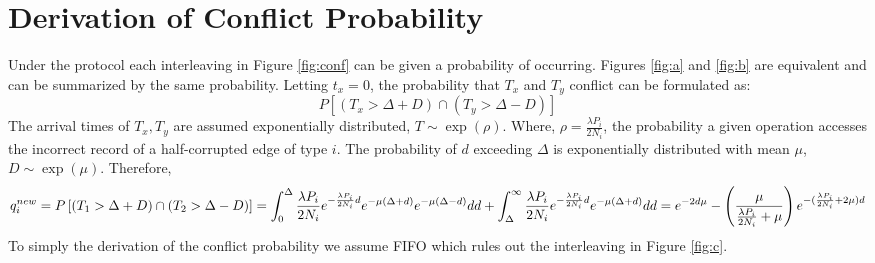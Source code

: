 \section{Derivation of Conflict Probability}
\label{sec:deriv-confl-prob}

Under the \tDelta protocol each interleaving in Figure \ref{fig:conf} can be given a probability of occurring. Figures \ref{fig:a} and \ref{fig:b} are equivalent and can be summarized by the same probability. Letting $t_x = 0$, the probability that $T_x$ and $T_y$ conflict can be formulated as: $$ P \left[ ( T_x >  \Delta + D) \cap (T_y > \Delta-D) \right]$$ The arrival times of $T_x,T_y$ are assumed exponentially distributed, $T \sim \exp (\rho)$.
Where, $ \rho  = \frac{\lambda P_i}{2N_i}$, the probability a given operation accesses the incorrect record of a half-corrupted edge of type $i$.
The probability of $d$ exceeding $\Delta$ is exponentially distributed with mean $\mu$, $D\sim \exp(\mu)$.
Therefore,
\begin{dmath*}
   q^{new}_{i} =  {P \left[ ( T_1 >  \Delta + D) \cap (T_2 > \Delta-D)  \right]} \\
   =  \int_{0}^{\Delta}  \frac{\lambda P_i}{2 N_i} e^{-\frac{\lambda P_i}{2 N_i} d} e^{-\mu (\Delta+d)} e^{-\mu (\Delta-d)} dd + \int_{\Delta}^{\infty} \frac{\lambda P_i}{2 N_i} e^{-\frac{\lambda P_i}{2 N_i} d} e^{-\mu (\Delta+d)} dd  \\
   =  e^{-2 d \mu} - \left( \frac{\mu}{\frac{\lambda P_i}{2 N_i} + \mu} \right) e^{-(\frac{\lambda P_i}{2 N_i}+ 2\mu)d} \\
 \end{dmath*}
To simply the derivation of the conflict probability we assume FIFO which rules out the interleaving in Figure \ref{fig:c}.



